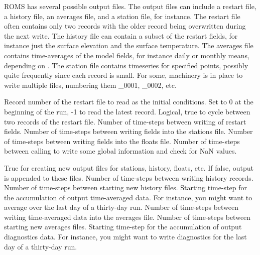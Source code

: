\begin{klist}
   ROMS has several possible output files. The output files can
   include a restart file, a history file, an averages file, and a
   station file, for instance.  The restart file often contains
   only two records with the older record being overwritten during
   the next write.  The history file can contain a subset of the
   restart fields, for instance just the surface elevation and the
   surface temperature.  The averages file contains time-averages
   of the model fields, for instance daily or monthly means,
   depending on .  The station file contains timeseries
   for specified points, possibly quite frequently since each record
   is small. For some, machinery is in place to write multiple
   files, numbering them \_0001, \_0002, etc.
     \begin{klist}
            Record number of the restart file to read
     as the initial conditions. Set to 0 at the beginning of the
     run, -1 to read the latest record.
        Logical, true to cycle between two records
     of the restart file.
             Number of time-steps between writing of
     restart fields.
             Number of time-steps between writing fields
     into the stations file.
             Number of time-steps between writing fields
     into the floats file.
            Number of time-steps between calling
        to write some global information and check for
       NaN values. 
     \end{klist}
    \mbox{}
     \begin{klist}
        True for creating new output files for
       stations, history, floats, etc. If false, output is appended
       to these files.
         Number of time-steps between writing history
       records.
         Number of time-steps between starting new history
       files.
           Starting time-step for the accumulation of
     output time-averaged data.  For instance, you might want to average
     over the last day of a thirty-day run.
             Number of time-steps between writing
     time-averaged data into the averages file.
             Number of time-steps between starting
     new averages files.
           Starting time-step for the accumulation of
     output diagnostics data.  For instance, you might want to write
     diagnostics for the last day of a thirty-day run.

\end{klist}
\end{klist}
